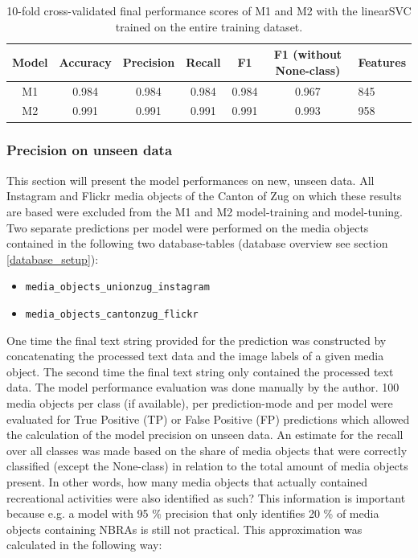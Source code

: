 \begin{table}[h]
\begin{center}
\caption{10-fold cross-validated final performance scores of M1 and M2 with the linearSVC trained on the entire training dataset.}\vspace{1ex}
\label{tab:m1_m2_linearSVC_final_scores}
\begin{tabular}{cccccc}\hline
Model & Accuracy & Precision & Recall & F1 & F1 (without None-class) & Features\\ \hline
M1 & 0.984 & 0.984 & 0.984 & 0.984 & 0.967 & 845\\
M2 & 0.991 & 0.991 & 0.991 & 0.991 & 0.993 & 958\\ \hline
\end{tabular}
\end{center}
\end{table}

\subsubsection{Precision on unseen data} \label{precision_unseen_data}
This section will present the model performances on new, unseen data. All Instagram and Flickr media objects of the Canton of Zug on which these results are based were excluded from the M1 and M2 model-training and model-tuning. Two separate predictions per model were performed on the media objects contained in the following two database-tables (database overview see section \ref{database_setup}):

\begin{itemize}
    \item \texttt{media\_objects\_unionzug\_instagram} \item \texttt{media\_objects\_cantonzug\_flickr}
\end{itemize}

One time the final text string provided for the prediction was constructed by concatenating the processed text data and the image labels of a given media object. The second time the final text string only contained the processed text data. The model performance evaluation was done manually by the author. 100 media objects per class (if available), per prediction-mode and per model were evaluated for True Positive (TP) or False Positive (FP) predictions which allowed the calculation of the model precision on unseen data. An estimate for the recall over all classes was made based on the share of media objects that were correctly classified (except the None-class) in relation to the total amount of media objects present. In other words, how many media objects that actually contained recreational activities were also identified as such? This information is important because e.g. a model with 95 \% precision that only identifies 20 \% of media objects containing NBRAs is still not practical. This approximation was calculated in the following way:

